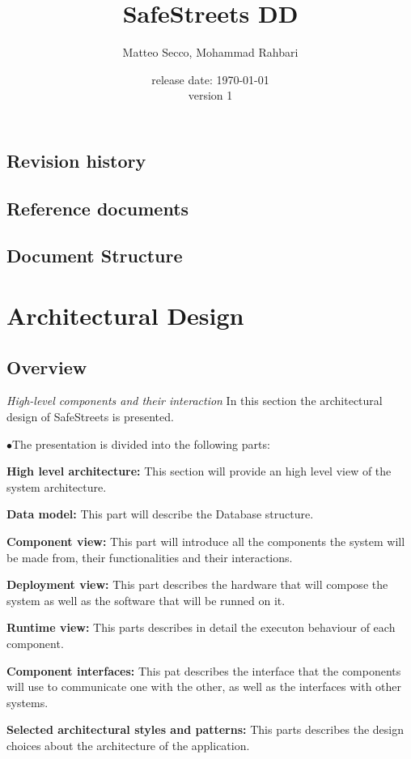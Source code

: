 \documentclass{article}
\title{SafeStreets DD}
\date{release date: \today\\version 1}
\author{Matteo Secco, Mohammad Rahbari}
\begin{document}
\maketitle
\newpage
\tableofcontents
\pagebreak
{}


	\subsection{Revision history}
	\subsection{Reference documents}
	\subsection{Document Structure}

\newpage
\section{Architectural Design}
	\subsection{Overview} \textit{High-level components and their interaction}
	In this section the architectural design of SafeStreets is presented. 
	\begin{list}{$\bullet$}{The presentation is divided into the following parts:}
		\item \textbf{High level architecture:} 
			This section will provide an high level view of the system architecture.
		\item \textbf{Data model:}
			This part will describe the Database structure.
		\item \textbf{Component view:} 
			This part will introduce all the components the system will be made from, their functionalities and their interactions.
		\item \textbf{Deployment view:} 
			This part describes the hardware that will compose the system as well as the software that will be runned on it.
		\item \textbf{Runtime view:} 
			This parts describes in detail the executon behaviour of each component.
		\item \textbf{Component interfaces:} 
			This pat describes the interface that the components will use to communicate one with the other, as well as the interfaces with other
			systems.
		\item \textbf{Selected architectural styles and patterns:} 
			This parts describes the design choices  about the architecture of the application.
	\end{list}
	\FloatBarrier
\end{document}
